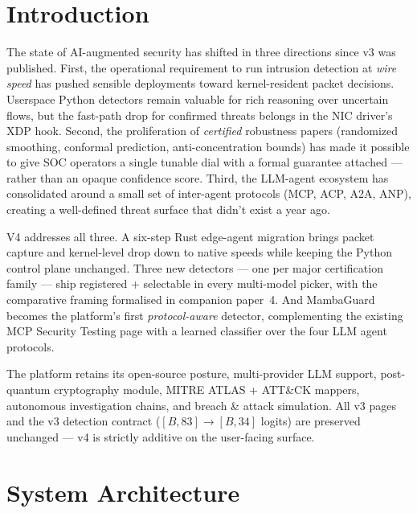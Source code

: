 \documentclass[11pt,a4paper]{article}
\begin{document}
\section{Introduction}
\label{sec:introduction}

The state of AI-augmented security has shifted in three directions
since v3 was published.  First, the operational requirement to run
intrusion detection at \emph{wire speed} has pushed sensible deployments
toward kernel-resident packet decisions.  Userspace Python detectors
remain valuable for rich reasoning over uncertain flows, but the
fast-path drop for confirmed threats belongs in the NIC driver's XDP
hook.  Second, the proliferation of \emph{certified} robustness papers
(randomized smoothing, conformal prediction, anti-concentration bounds)
has made it possible to give SOC operators a single tunable dial with a
formal guarantee attached --- rather than an opaque confidence score.
Third, the LLM-agent ecosystem has consolidated around a small set of
inter-agent protocols (MCP, ACP, A2A, ANP), creating a well-defined
threat surface that didn't exist a year ago.

V4 addresses all three.  A six-step Rust edge-agent migration brings
packet capture and kernel-level drop down to native speeds while keeping
the Python control plane unchanged.  Three new detectors --- one per
major certification family --- ship registered + selectable in every
multi-model picker, with the comparative framing formalised in
companion paper~4.  And MambaGuard becomes the platform's
first \emph{protocol-aware} detector, complementing the existing MCP
Security Testing page with a learned classifier over the four LLM
agent protocols.

The platform retains its open-source posture, multi-provider LLM
support, post-quantum cryptography module, MITRE ATLAS + ATT\&CK
mappers, autonomous investigation chains, and breach \& attack
simulation.  All v3 pages and the v3 detection contract
(\([B, 83] \to [B, 34]\) logits) are preserved unchanged --- v4 is
strictly additive on the user-facing surface.

\section{System Architecture}
\label{sec:architecture}
\end{document}
